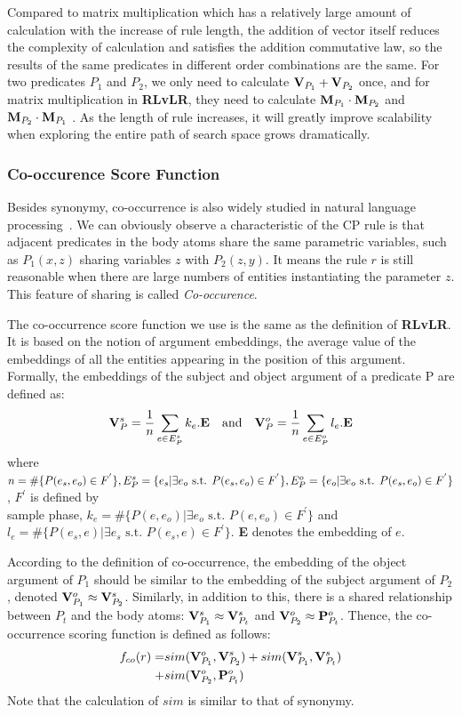 \documentclass{article}
\begin{document}
	Compared to matrix multiplication which has a relatively large amount of calculation with the increase of rule length, the addition of vector itself reduces the complexity of calculation and satisfies the addition commutative law, so the results of the same predicates in different order combinations are the same. For two predicates $P_1$ and $P_2$, we only need to calculate ${\bf V}_{P_1}+{\bf V}_{P_2}$ once, and for matrix multiplication in {\bf RLvLR}, they need to calculate ${\bf M}_{P_1}\cdot {\bf M}_{P_2}$ and ${\bf M}_{P_2}\cdot {\bf M}_{P_1}$ . As the length of rule increases, it will greatly improve scalability when exploring the entire path of search space grows dramatically.

	\subsubsection{Co-occurence Score Function}
	Besides synonymy, co-occurrence is also widely studied in natural language processing~\cite{Jones:Co-occurence}. We can obviously observe a characteristic of the CP rule is that adjacent predicates in the body atoms share the same parametric variables, such as $P_1(x,z)$ sharing variables $z$ with $P_2(z,y)$. It means the rule $r$ is still reasonable when there are large numbers of entities instantiating the parameter $z$. This feature of sharing is called \textit{Co-occurence}. 
	
	The co-occurrence score function we use is the same as the definition of {\bf RLvLR}. It is based on the notion of argument embeddings, the average value of
the embeddings of all the entities appearing in the position of
this argument. Formally, the embeddings of the subject and
object argument of a predicate P are defined as:
	$$
	{\bf V}_P^s = \frac{1}{n} \sum _{e \in E_P^s}k_e.{\bf E} \text{\quad and\quad}	
	{\bf V}_P^o = \frac{1}{n} \sum _{e \in E_P^o}l_e.{\bf E} 
	$$ 
	where $n = \#\{P(e_s, e_o) \in F^{'}\}, E_P^s = \{e_s|\exists e_o \text{ s.t. } P(e_s, e_o)\\
	\in F^{'}\} , E_P^o = \{e_o|\exists e_o \text{ s.t. } P(e_s, e_o) \in F^{'}\}$, $F^{'}$ is defined by\\
	sample phase, $k_e = \#\{P(e, e_o)|\exists e_o \text{ s.t. } P(e, e_o) \in F^{'} \}$ and
$l_e = \#\{P(e_s,e)|\exists e_s \text{ s.t. } P(e_s, e) \in F^{'} \}$. {\bf E} denotes the embedding of $e$.
	
	According to the definition of co-occurrence, the embedding of the object argument of $P_1$ should be similar to the
embedding of the subject argument of $P_2$, denoted ${\bf V}^o_{P_1} \approx {\bf V}^s_{P_2}$.
Similarly, in addition to this, there is a shared relationship between $P_t$ and the body atoms: ${\bf V}^s_{P_1} \approx {\bf V}^s_{P_t}$ and ${\bf V}^o_{P_2} \approx {\bf P}^o_{P_t}$. Thence, the co-occurrence scoring function is defined as follows:
	\begin{align}
	f_{co}(r) = &sim({\bf V}^o_{P_1}, {\bf V}^s_{P_2}) + sim({\bf V}^s_{P_1}, {\bf V}^s_{P_t}) \nonumber\\
	 +& sim({\bf V}^o_{P_2}, {\bf P}^o_{P_t}) 
	\end{align}
	Note that the calculation of $sim$ is similar to that of synonymy.
	
\end{document}
